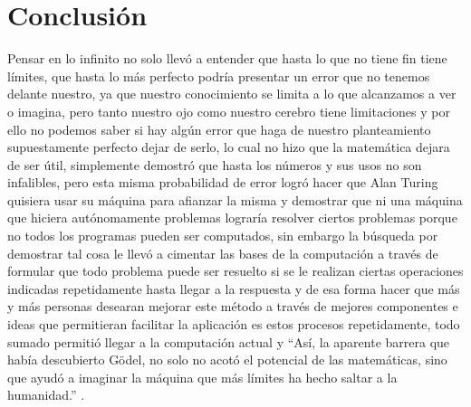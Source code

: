 \documentclass[a4paper,12pt]{article}
\theoremstyle{definition}
\begin{document}
\section{Conclusión}
Pensar en lo infinito no solo llevó a entender que hasta lo que no tiene fin tiene límites, que hasta lo más perfecto podría presentar un error que no tenemos delante nuestro, ya que nuestro conocimiento se limita a lo que alcanzamos a ver o imagina, pero tanto nuestro ojo como nuestro cerebro tiene limitaciones y por ello no podemos saber si hay algún error que haga de nuestro planteamiento supuestamente perfecto dejar de serlo, lo cual no hizo que la matemática dejara de ser útil, simplemente demostró que hasta los números y sus usos no son infalibles, pero esta misma probabilidad de error logró hacer que Alan Turing quisiera usar su máquina para afianzar la misma y demostrar que ni una máquina que hiciera autónomamente problemas lograría resolver ciertos problemas porque no todos los programas pueden ser computados, sin embargo la búsqueda por demostrar tal cosa le llevó a cimentar las bases de la computación a través de formular que todo problema puede ser resuelto si se le realizan ciertas operaciones indicadas repetidamente hasta llegar a la respuesta y de esa forma hacer que más y más personas desearan mejorar este método a través de mejores componentes e ideas que permitieran facilitar la aplicación es estos procesos repetidamente, todo sumado permitió llegar a la computación actual y “Así, la aparente barrera que había descubierto Gödel, no solo no acotó el potencial de las matemáticas, sino que ayudó a imaginar la máquina que más límites ha hecho saltar a la humanidad.” \citep{Maestre}. 






\nocite{Cabezon,Crespo,Paez,Pais}


\end{document}
